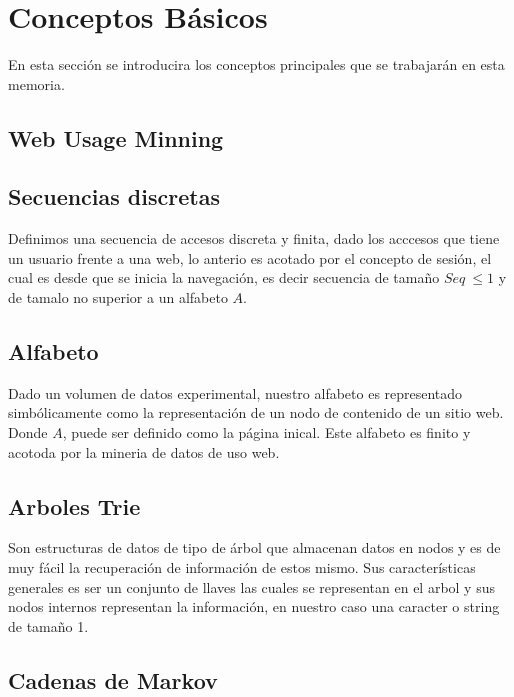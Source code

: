 
\section{Conceptos Básicos}


En esta sección se introducira los conceptos principales que se trabajarán en esta memoria.

\subsection{Web Usage Minning}


\subsection{Secuencias discretas}

Definimos una secuencia de accesos discreta y finita, dado los acccesos que tiene un usuario frente a una web, lo anterio es acotado por el concepto de sesión, el cual es desde que se inicia la navegación, es decir secuencia de tamaño $Seq\ \leq 1$ y de tamalo no superior a un alfabeto $A$.


\subsection{Alfabeto}

Dado un volumen de datos experimental, nuestro alfabeto es representado simbólicamente como la representación de un nodo de contenido de un sitio web.
Donde $A $, puede ser definido como la página inical. Este alfabeto es finito y acotoda por la mineria de datos de uso web.



\subsection{Arboles Trie}


Son estructuras de datos de tipo de árbol que almacenan datos en nodos y es de muy fácil la recuperación de información de estos mismo. Sus características generales es ser un conjunto de llaves las cuales se representan en el arbol y sus nodos internos representan la información, en nuestro caso una caracter o string de tamaño 1.


\subsection{Cadenas de Markov}




